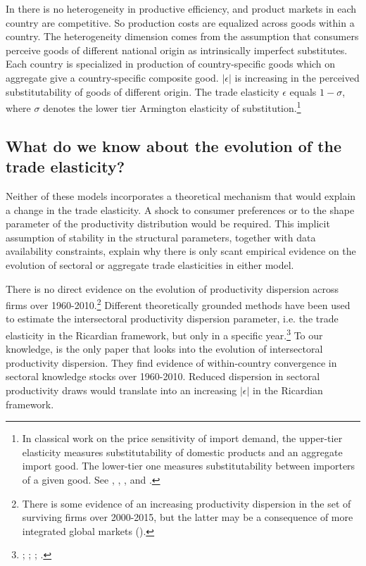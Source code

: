 \documentclass[12pt,twoside,a4paper,notitlepage]{article}
\begin{document}
In \cite{Anderson2003} there is no heterogeneity in productive efficiency, and
product markets in each country are competitive.
So production costs are equalized across goods within a country.
The heterogeneity dimension comes from the assumption that consumers perceive goods of different national origin as intrinsically imperfect substitutes.
Each country is specialized in production of country-specific goods which on aggregate give a country-specific composite good.
$|\epsilon|$ is increasing in the perceived substitutability of goods of different origin. 
The trade elasticity $\epsilon$ equals $1-\sigma$, where $\sigma$ denotes the lower tier Armington elasticity of substitution.\footnote{In classical work on the price sensitivity of import demand, the upper-tier elasticity measures substitutability of domestic products and an aggregate import good.
The lower-tier one measures substitutability between importers of a given good.
See \cite{Sato1967}, \cite{Reinert1991}, \cite{Saito2004}, and \cite{Feenstra2018}.} 

\subsection{What do we know about the evolution of the trade elasticity?}

Neither of these models incorporates a theoretical mechanism that would explain a change in the trade elasticity.
A shock to consumer preferences or to the shape parameter of the productivity distribution would be required. This implicit assumption of stability in the structural parameters, together with data availability constraints, explain why there is only scant empirical evidence on the evolution of sectoral or aggregate trade elasticities in either model. 

There is no direct evidence on the evolution of productivity dispersion across firms over 1960-2010.\footnote{There is some evidence of an increasing productivity dispersion in the set of surviving firms over 2000-2015, but the latter may be a consequence of more integrated global markets (\cite{DiGiovanni2011}).}
Different theoretically grounded methods have been used to estimate the intersectoral productivity dispersion parameter, i.e. the trade elasticity in the Ricardian framework, but only in a specific year.\footnote{\cite{Eaton2002}; \cite{Simonovska2014}; \cite{Costinot2012a}; \cite{Caliendo2015}.}  To our knowledge, \cite{Levchenko2016} is the only paper that looks into  the evolution of intersectoral productivity dispersion. They find evidence of within-country convergence in sectoral knowledge stocks over 1960-2010.
Reduced dispersion in sectoral productivity draws would translate into an increasing $|\epsilon|$ in the Ricardian framework.
\end{document}
